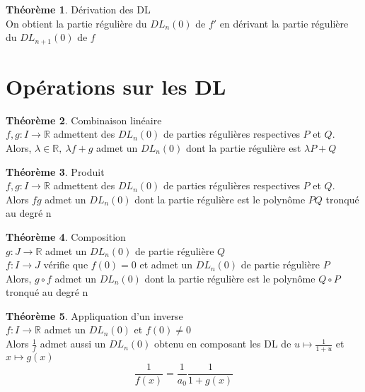 \documentclass[fleqn]{article}
\theoremstyle{definition} \newtheorem*{defi}{D\'efinition}
\theoremstyle{definition} \newtheorem*{theo}{Th\'eor\`eme}
\theoremstyle{definition} \newtheorem*{prop}{Propri\'et\'e}
\theoremstyle{definition} \newtheorem*{coro}{Corollaire}
\theoremstyle{remark} \newtheorem*{rqs}{Remarques}
\begin{document}
\begin{theo} D\'erivation des DL \\
	On obtient la partie r\'eguli\`ere du $DL_n(0)$ de $f'$ en d\'erivant la partie r\'eguli\`ere du $DL_{n+1}(0)$ de $f$
\end{theo}

\section{Op\'erations sur les DL}
\begin{theo} Combinaison lin\'eaire\\
	$f,g: I \rightarrow \mathbb{R}$ admettent des $DL_n(0)$ de parties r\'eguli\`eres respectives $P$ et $Q$. \\
	Alors, $\lambda \in \mathbb{R},\ \lambda f + g$ admet un $DL_n(0)$ dont la partie r\'eguli\`ere est $\lambda P + Q$
\end{theo}

\begin{theo} Produit \\
	$f,g: I \rightarrow \mathbb{R}$ admettent des $DL_n(0)$ de parties r\'eguli\`eres respectives $P$ et $Q$. \\
	Alors $fg$ admet un $DL_n(0)$ dont la partie r\'eguli\`ere est le polyn\^ome $PQ$ tronqu\'e au degr\'e n
\end{theo}

\begin{theo} Composition \\
	$g: J \rightarrow \mathbb{R}$ admet un $DL_n(0)$ de partie r\'eguli\`ere $Q$ \\
	$f: I \rightarrow J$ v\'erifie que $f(0) = 0$ et admet un $DL_n(0)$ de partie r\'eguli\`ere $P$ \\
	Alors, $g \circ f$ admet un $DL_n(0)$ dont la partie r\'eguli\`ere est le polyn\^ome $Q \circ P$ tronqu\'e au degr\'e n
\end{theo}

\begin{theo} Appliquation d'un inverse \\
	$f: I \rightarrow \mathbb{R}$ admet un $DL_n(0)$ et $f(0) \neq 0$ \\
	Alors $\frac{1}{f}$ admet aussi un $DL_n(0)$ obtenu en composant les DL de $u \mapsto \frac{1}{1+u}$ et $x \mapsto g(x)$
	\[\frac{1}{f(x)} = \frac{1}{a_0} \frac{1}{1 + g(x)}\]
\end{theo}

\end{document}

